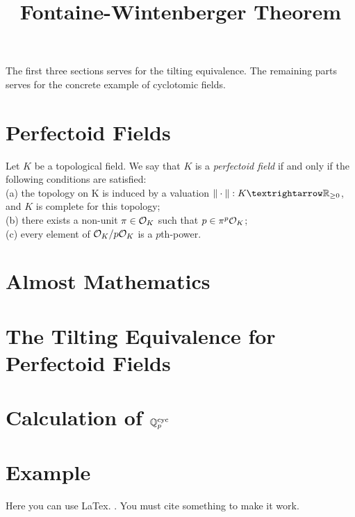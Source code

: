 \title{Fontaine-Wintenberger Theorem}




\maketitle


\tableofcontents

The first three sections serves for the tilting equivalence. The remaining parts serves for the concrete example of cyclotomic fields.

\section{Perfectoid Fields}

\begin{definition}
    \label{Perfectoid Field}

    Let $K$ be a topological field. We say that $K$ is a \emph{perfectoid field} if and only if the following conditions are satisfied:\\
    (a) the topology on K is induced by a valuation $\| \cdot \| : K → \R _{\ge0}$, and $K$ is complete for this topology;\\
    (b) there exists a non-unit $\pi \in \mathcal{O}_K$ such that $p \in \pi^p \mathcal{O}_K$;\\
    (c) every element of $\mathcal{O}_K/p\mathcal{O}_K$ is a $p$th-power.
\end{definition}



\section{Almost Mathematics}

\section{The Tilting Equivalence for Perfectoid Fields}

\section{Calculation of $\mathbb{Q}_p^{{\text{cyc}}}$}


\section{Example}
Here you can use LaTex. \cite{marcus}. You must cite something to make it work.


